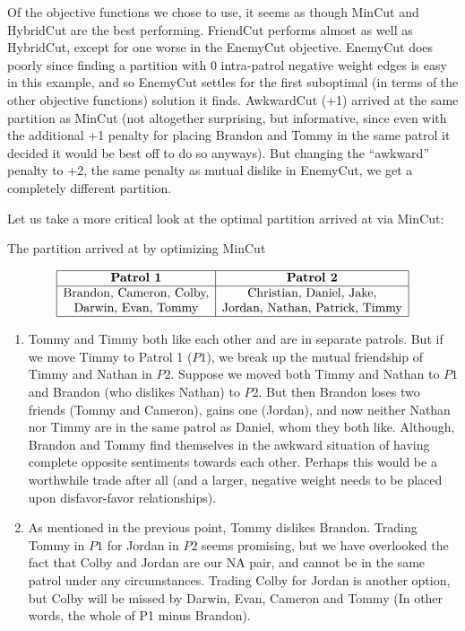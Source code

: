 \documentclass{amsart}
\theoremstyle{definition}
\theoremstyle{remark}
\numberwithin{equation}{section}
\begin{document}
\clearpage

Of the objective functions we chose to use, it seems as though MinCut and HybridCut are the best performing. FriendCut performs almost as well as HybridCut, except for one worse in the EnemyCut objective. EnemyCut does poorly since finding a partition with 0 intra-patrol negative weight edges is easy in this example, and so EnemyCut settles for the first suboptimal (in terms of the other objective functions) solution it finds. AwkwardCut (+1) arrived at the same partition as MinCut (not altogether surprising, but informative, since even with the additional +1 penalty for placing Brandon and Tommy in the same patrol it decided it would be best off to do so anyways). But changing the ``awkward'' penalty to +2, the same penalty as mutual dislike in EnemyCut, we get a completely different partition.

Let us take a more critical look at the optimal partition arrived at via MinCut:

\begin{table}[h]
	\caption{The partition arrived at by optimizing MinCut}\label{eqtable}
	\renewcommand\arraystretch{1.5}
	\noindent\[
	\begin{array}{|c|c|}
	\hline
	\textbf{Patrol 1}&\textbf{Patrol 2}\\
	\hline
	\text{Brandon, Cameron, Colby,}&\text{Christian, Daniel, Jake,}\\
	\text{Darwin, Evan, Tommy}&\text{Jordan, Nathan, Patrick, Timmy}\\
	\hline
	\end{array}
	\]
\end{table}

\begin{enumerate}
	\item Tommy and Timmy both like each other and are in separate patrols. But if we move Timmy to Patrol 1 ($P1$), we break up the mutual friendship of Timmy and Nathan in $P2$. Suppose we moved both Timmy and Nathan to $P1$ and Brandon (who dislikes Nathan) to $P2$. But then Brandon loses two friends (Tommy and Cameron), gains one (Jordan), and now neither Nathan nor Timmy are in the same patrol as Daniel, whom they both like. Although, Brandon and Tommy find themselves in the awkward situation of having complete opposite sentiments towards each other. Perhaps this would be a worthwhile trade after all (and a larger, negative weight needs to be placed upon disfavor-favor relationships).
	
	\item As mentioned in the previous point, Tommy dislikes Brandon. Trading Tommy in $P1$ for Jordan in $P2$ seems promising, but we have overlooked the fact that Colby and Jordan are our NA pair, and cannot be in the same patrol under any circumstances. Trading Colby for Jordan is another option, but Colby will be missed by Darwin, Evan, Cameron and Tommy (In other words, the whole of P1 minus Brandon).
\end{enumerate}
\end{document}
